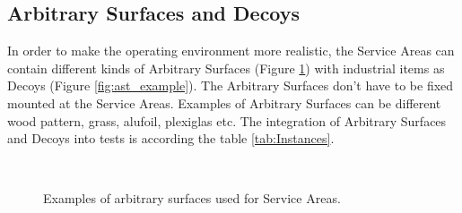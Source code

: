 \subsection{Arbitrary Surfaces and Decoys}
\label{subsec:Arbitrary_Surfaces_and_Decoys}

In order to make the operating environment more realistic, the Service Areas can contain different kinds of Arbitrary Surfaces (Figure \ref{fig:ast_surface_example}) with industrial items as Decoys (Figure \ref{fig:ast_example}). The Arbitrary Surfaces don't have to be fixed mounted at the Service Areas. Examples of Arbitrary Surfaces can be different wood pattern, grass, alufoil, plexiglas etc. The integration of Arbitrary Surfaces and Decoys into tests is according the table \ref{tab:Instances}.

\begin{figure}[h!]
	\centering
	\hspace{.05\textwidth}
	\hspace{.05\textwidth}
	\\
	\hspace{.05\textwidth}
	\caption{Examples of arbitrary surfaces used for Service Areas.}
	\label{fig:ast_surface_example}
\end{figure}

